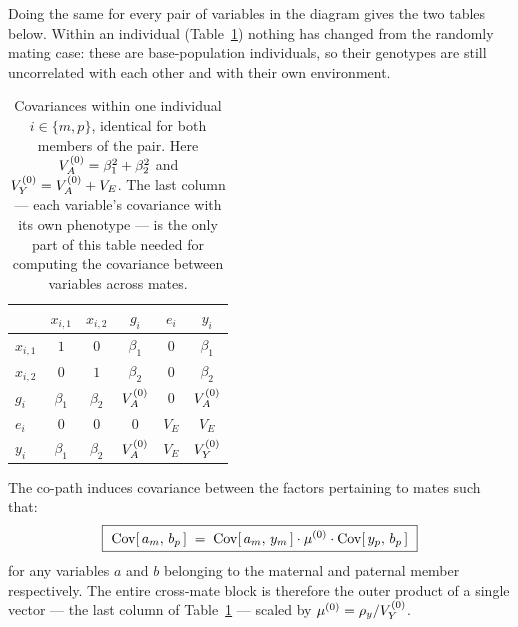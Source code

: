 \documentclass[12pt]{article}
\begin{document}
Doing the same for every pair of variables in the diagram gives the two tables below.
Within an individual (Table~\ref{tab:pair-2v-within}) nothing has changed from the randomly mating case:
these are base-population individuals, so their genotypes are still uncorrelated with each other and with their own environment.

\begin{table}[H]
    \begin{floatcard}
    \begin{tabular}{l|ccccc}
                  & $x_{i,1}$      & $x_{i,2}$      & $g_i$     & $e_i$   & $y_i$     \\
        \hline
        $x_{i,1}$ & $1$            & $0$            & $\beta_1$ & $0$     & $\beta_1$ \\
        $x_{i,2}$ & $0$            & $1$            & $\beta_2$ & $0$     & $\beta_2$ \\
        $g_i$     & $\beta_1$      & $\beta_2$      & $V_A^{(0)}$    & $0$     & $V_A^{(0)}$    \\
        $e_i$     & $0$            & $0$            & $0$       & $V_E$   & $V_E$     \\
        $y_i$     & $\beta_1$      & $\beta_2$      & $V_A^{(0)}$    & $V_E$   & $V_Y^{(0)}$    \\
    \end{tabular}
    \caption{%
        Covariances within one individual $i \in \{m,p\}$, identical for both members of the pair.
        Here $V_A^{(0)} = \beta_1^2 + \beta_2^2$ and $V_Y^{(0)} = V_A^{(0)} + V_E$.
        The last column --- each variable's covariance with its own phenotype --- is the only part of this table needed for computing the covariance between variables across mates.%
    }
    \label{tab:pair-2v-within}
    \end{floatcard}
\end{table}

The co-path induces covariance between the factors pertaining to mates such that:
\begin{equation}\label{eq:leg-rule}
    \boxed{\ \mathrm{Cov}[\,a_m,\, b_p\,] \;=\; \mathrm{Cov}[\,a_m,\, y_m\,] \cdot \mu^{(0)} \cdot \mathrm{Cov}[\,y_p,\, b_p\,] \ }
\end{equation}
for any variables $a$ and $b$ belonging to the maternal and paternal member respectively.
The entire cross-mate block is therefore the outer product of a single vector --- the last column of Table~\ref{tab:pair-2v-within} --- scaled by $\mu^{(0)} = \rho_y/V_Y^{(0)}$.
\end{document}
